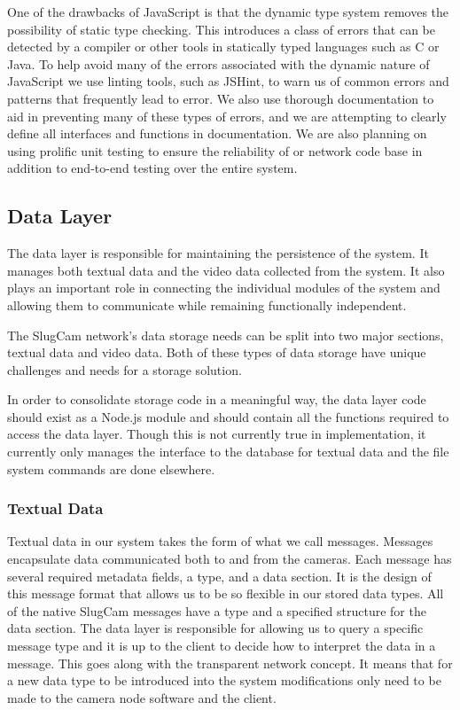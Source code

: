 One of the drawbacks of JavaScript is that the dynamic type system removes the
possibility of static type checking. This introduces a class of errors that can
be detected by a compiler or other tools in statically typed languages such as C
or Java. To help avoid many of the errors associated with the dynamic nature of
JavaScript we use linting tools, such as JSHint, to warn us of common errors and
patterns that frequently lead to error. We also use thorough documentation to
aid in preventing many of these types of errors, and we are attempting to clearly
define all interfaces and functions in documentation.  We are also planning on
using prolific unit testing to ensure the reliability of or network code base in
addition to end-to-end testing over the entire system.

\subsection{Data Layer}

The data layer is responsible for maintaining the persistence of the system. It
manages both textual data and the video data collected from the system. It also
plays an important role in connecting the individual modules of the system and
allowing them to communicate while remaining functionally independent.

The SlugCam network's data storage needs can be split into two major sections,
textual data and video data. Both of these types of data storage have unique
challenges and needs for a storage solution.

In order to consolidate storage code in a meaningful way, the data layer code
should exist as a Node.js module and should contain all the functions required
to access the data layer. Though this is not currently true in implementation,
it currently only manages the interface to the database for textual data and the
file system commands are done elsewhere.

\subsubsection{Textual Data}

Textual data in our system takes the form of what we call messages. Messages
encapsulate data communicated both to and from the cameras. Each message has
several required metadata fields, a type, and a data section. It is the design
of this message format that allows us to be so flexible in our stored data
types. All of the native SlugCam messages have a type and a specified structure
for the data section. The data layer is responsible for allowing us to query a
specific message type and it is up to the client to decide how to interpret the
data in a message. This goes along with the transparent network concept. It
means that for a new data type to be introduced into the system modifications
only need to be made to the camera node software and the client.

